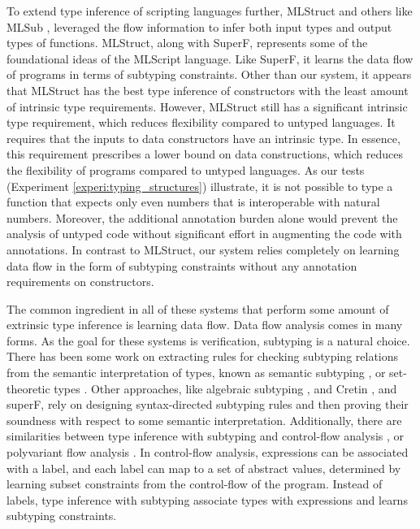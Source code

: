 \documentclass[acmsmall]{acmart}
\theoremstyle{definition}
\begin{document}
To extend type inference of scripting languages further, MLStruct \cite{} and others like MLSub \cite{}, 
leveraged the flow information to infer both input types and output types of functions.
MLStruct, along with SuperF, represents some of the foundational ideas of the MLScript language.
Like SuperF, it learns the data flow of programs in terms of subtyping constraints.
Other than our system, it appears that MLStruct has the best type inference of constructors
with the least amount of intrinsic type requirements. 
However, MLStruct still has a significant intrinsic type requirement, which reduces flexibility compared
to untyped languages. It requires that the inputs to data constructors have an intrinsic type.  
In essence, this requirement prescribes a lower bound on data constructions,
which reduces the flexibility of programs compared to untyped languages. 
As our tests (Experiment \ref{experi:typing_structures})
illustrate, it is not possible to type a function that expects only even numbers that is interoperable with natural numbers.
Moreover, the additional annotation burden alone would prevent the analysis of untyped code without
significant effort in augmenting the code with annotations.
In contrast to MLStruct, our system relies completely on learning data flow in the form of subtyping constraints
without any annotation requirements on constructors. 

The common ingredient in all of these systems that perform some amount of extrinsic type inference is
learning data flow. Data flow analysis comes in many forms. As the goal for these systems is verification,
subtyping is a natural choice. There has been some work on extracting rules for checking subtyping relations
from the semantic interpretation of types, known as semantic subtyping \cite{}, or set-theoretic types \cite{}.
Other approaches, like algebraic subtyping \cite{}, and Cretin \cite{}, and superF, 
rely on designing syntax-directed subtyping rules and then proving their soundness with respect to some semantic interpretation. 
Additionally, there are similarities between type inference with subtyping and control-flow analysis \cite{}, or polyvariant flow analysis \cite{}.
In control-flow analysis, expressions can be associated with a label, and each label can map to a set of abstract values,
determined by learning subset constraints from the control-flow of the program. 
Instead of labels, type inference with subtyping associate types  
with expressions and learns subtyping constraints.

\end{document}
